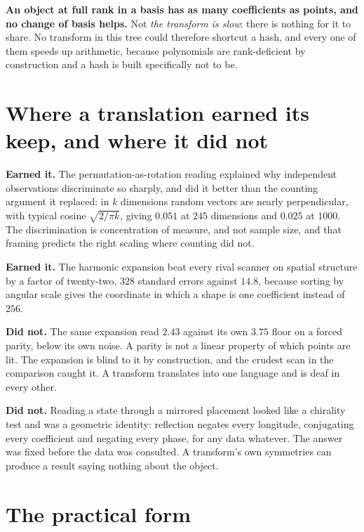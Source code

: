 \textbf{An object at full rank in a basis has as many coefficients as points, and no change of basis helps.} Not \emph{the transform is slow}: there is nothing for it to share. No transform in this tree could therefore shortcut a hash, and every one of them speeds up arithmetic, because polynomials are rank-deficient by construction and a hash is built specifically not to be.

\section{Where a translation earned its keep, and where it did not}

\textbf{Earned it.} The permutation-as-rotation reading explained why independent observations discriminate so sharply, and did it better than the counting argument it replaced: in \(k\) dimensions random vectors are nearly perpendicular, with typical cosine \(\sqrt{2/\pi k}\), giving \(0.051\) at \(245\) dimensions and \(0.025\) at \(1000\). The discrimination is concentration of measure, and not sample size, and that framing predicts the right scaling where counting did not.

\textbf{Earned it.} The harmonic expansion beat every rival scanner on spatial structure by a factor of twenty-two, \(328\) standard errors against \(14.8\), because sorting by angular scale gives the coordinate in which a shape is one coefficient instead of \(256\).

\textbf{Did not.} The same expansion read \(2.43\) against its own \(3.75\) floor on a forced parity, below its own noise. A parity is not a linear property of which points are lit. The expansion is blind to it by construction, and the crudest scan in the comparison caught it. A transform translates into one language and is deaf in every other.

\textbf{Did not.} Reading a state through a mirrored placement looked like a chirality test and was a geometric identity: reflection negates every longitude, conjugating every coefficient and negating every phase, for any data whatever. The answer was fixed before the data was consulted. A transform's own symmetries can produce a result saying nothing about the object.

\section{The practical form}

